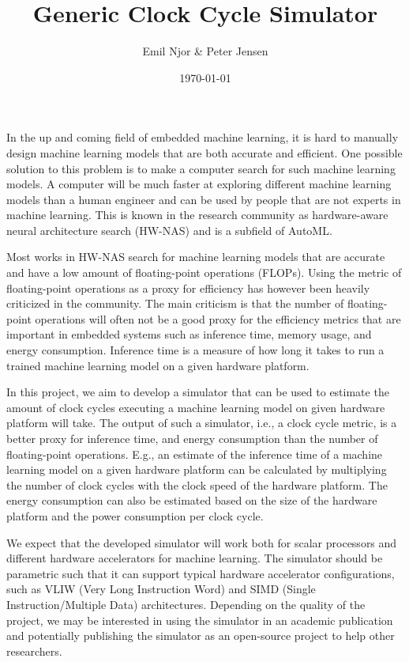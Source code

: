 \documentclass{article}
\title{Generic Clock Cycle Simulator}
\author{Emil Njor \& Peter Jensen}
\date{\today}
\begin{document}
\maketitle
In the up and coming field of embedded machine learning, it is hard to manually design machine learning models that are both accurate and efficient.
One possible solution to this problem is to make a computer search for such machine learning models.
A computer will be much faster at exploring different machine learning models than a human engineer and can be used by people that are not experts in machine learning.
This is known in the research community as hardware-aware neural architecture search (HW-NAS) and is a subfield of AutoML.

Most works in HW-NAS search for machine learning models that are accurate and have a low amount of floating-point operations (FLOPs).
Using the metric of floating-point operations as a proxy for efficiency has however been heavily criticized in the community.
The main criticism is that the number of floating-point operations will often not be a good proxy for the efficiency metrics that are important in embedded systems such as inference time, memory usage, and energy consumption.
Inference time is a measure of how long it takes to run a trained machine learning model on a given hardware platform.

In this project, we aim to develop a simulator that can be used to estimate the amount of clock cycles executing a machine learning model on given hardware platform will take.
The output of such a simulator, i.e., a clock cycle metric, is a better proxy for inference time, and energy consumption than the number of floating-point operations.
E.g., an estimate of the inference time of a machine learning model on a given hardware platform can be calculated by multiplying the number of clock cycles with the clock speed of the hardware platform.
The energy consumption can also be estimated based on the size of the hardware platform and the power consumption per clock cycle.

We expect that the developed simulator will work both for scalar processors and different hardware accelerators for machine learning.
The simulator should be parametric such that it can support typical hardware accelerator configurations, such as VLIW (Very Long Instruction Word) and SIMD (Single Instruction/Multiple Data) architectures.
Depending on the quality of the project, we may be interested in using the simulator in an academic publication and potentially publishing the simulator as an open-source project to help other researchers.
\end{document}
